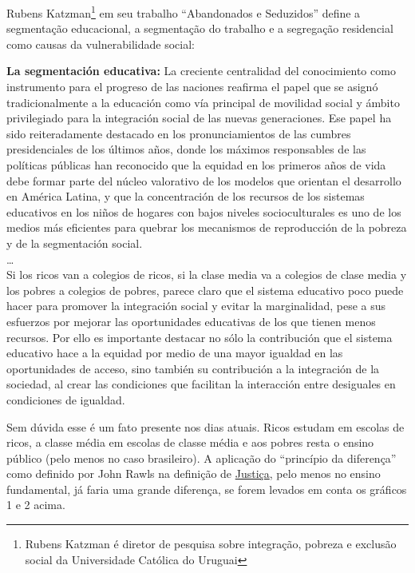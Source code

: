 \documentclass[
	12pt,				%
	openright,			%
	twoside,			%
	a4paper,			%
	chapter=TITLE,		%
	section=TITLE,		%
	subsection=TITLE,	%
	subsubsection=TITLE,%
	spanish,            %
	english,			%
	brazil				%
	]{abntex2}
\begin{document}
Rubens Katzman\footnote{Rubens Katzman é diretor de pesquisa sobre integração, pobreza e exclusão social da Universidade Católica do Uruguai} em seu trabalho “Abandonados e Seduzidos” define a segmentação educacional, a segmentação do trabalho e a segregação residencial como causas da vulnerabilidade social: 
\begin{citacao}[spanish]
	\textbf{La segmentación educativa:} La creciente centralidad del conocimiento como instrumento para el progreso de las naciones reafirma el
	papel que se asignó tradicionalmente a la educación	como vía principal de movilidad social y ámbito privilegiado para la integración social de las nuevas generaciones. Ese papel ha sido reiteradamente destacado en los pronunciamientos de las cumbres presidenciales de los últimos años, donde los máximos responsables de las políticas públicas han reconocido que la equidad en los primeros años de vida debe formar parte del núcleo valorativo de los modelos que orientan el desarrollo en América Latina, y que la concentración
	de los recursos de los sistemas educativos en los niños de hogares con bajos niveles socioculturales es uno
	de los medios más eficientes para quebrar los mecanismos de reproducción de la pobreza y de la segmentación social.\\
	\ldots\\ Si los ricos van a colegios de ricos, si la clase media va a colegios de clase media y los pobres a colegios de pobres, parece claro que el sistema educativo	poco puede hacer para promover la integración social y evitar la marginalidad, pese a sus esfuerzos por
	mejorar las oportunidades educativas de los que tienen menos recursos. Por ello es importante destacar no sólo la contribución que el sistema educativo hace a la	equidad por medio de una mayor igualdad en las oportunidades de acceso, sino también su contribución a la
	integración de la sociedad, al crear las condiciones que facilitan la interacción entre desiguales en condiciones de igualdad.\cite[p. ~176-177]{Katzman}
\end{citacao}
\par
\hypertarget{rawls1}{}
Sem dúvida esse é um fato presente nos dias atuais. Ricos estudam em escolas de ricos, a classe média em escolas de classe média e aos pobres resta o ensino público (pelo menos no caso brasileiro). A aplicação do  “princípio da diferença” como definido por John Rawls na definição de \hyperlink{rawls}{Justiça}, pelo menos no ensino fundamental, já faria uma grande diferença, se forem levados em conta os gráficos 1 e 2 acima.
\end{document}
